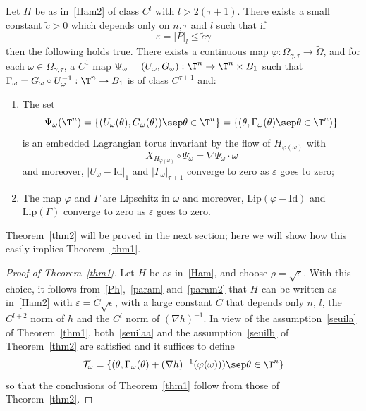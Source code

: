 \begin{Main}\label{thm2}
Let $H$ be as in~\eqref{Ham2} of class $C^l$ with $l>2(\tau+1)$. There exists a small constant $\tilde{c}>0$ which depends only on $n,\tau$ and $l$ such that if
\begin{equation}\label{seuilb}
\varepsilon=|P|_l \leq \tilde{c} \gamma
\end{equation}
then the following holds true. There exists a continuous map $\varphi : \Omega_{\gamma,\tau} \to \tilde{\Omega}$, and for each $\omega \in \Omega_{\gamma,\tau}$, a $C^1$ map $\Psi_\omega=(U_\omega,G_\omega) : \T^n \to \T^n \times B_1$ such that $\Gamma_\omega=G_\omega \circ U_\omega^{-1} : \T^n \to B_1$ is of class $C^{\tau+1}$ and:

\begin{enumerate}
\item
The set
\[ \Psi_\omega(\T^n)=\{(U_\omega(\theta),G_\omega(\theta)) \sep \theta \in \T^n\} =\{(\theta,\Gamma_\omega(\theta) \sep \theta \in \T^n)\} \]
is an embedded Lagrangian torus invariant by the flow of $H_{\varphi(\omega)}$ with
\[ X_{H_{\varphi(\omega)}} \circ \Psi_\omega=\nabla \Psi_\omega\cdot \omega \]
and moreover, $|U_\omega-\mathrm{Id}|_1$ and $|\Gamma_\omega|_{\tau+1}$ converge to zero as $\varepsilon$ goes to zero;

\item
The map $\varphi$ and $\Gamma$ are Lipschitz in $\omega$ and moreover, $\mathrm{Lip}(\varphi-\mathrm{Id})$ and $\mathrm{Lip}(\Gamma)$ converge to zero as $\varepsilon$ goes to zero.
\end{enumerate}
\end{Main}

Theorem~\ref{thm2} will be proved in the next section; here we will show how this easily implies Theorem~\ref{thm1}.

\begin{proof}[Proof of Theorem~\ref{thm1}]
Let $H$ be as in~\eqref{Ham}, and choose $\rho=\sqrt{\epsilon}$. With this choice, it follows from~\eqref{Ph},~\eqref{param} and~\eqref{param2} that $H$ can be written as in~\eqref{Ham2} with $\varepsilon=\tilde{C}\sqrt{\epsilon}$, with a large constant $\tilde{C}$ that depends only $n$, $l$, the $C^{l+2}$ norm of $h$ and the $C^{l}$ norm of $(\nabla h)^{-1}$. In view of the assumption~\eqref{seuila} of Theorem~\ref{thm1}, both~\eqref{seuilaa} and the assumption~\eqref{seuilb} of Theorem~\ref{thm2} are satisfied and it suffices to define
\[ \mathcal{T}_\omega=\{(\theta,\Gamma_\omega(\theta)+(\nabla h)^{-1}(\varphi(\omega))) \sep \theta \in \T^n\} \]
so that the conclusions of Theorem~\ref{thm1} follow from those of Theorem~\ref{thm2}.
\end{proof}

